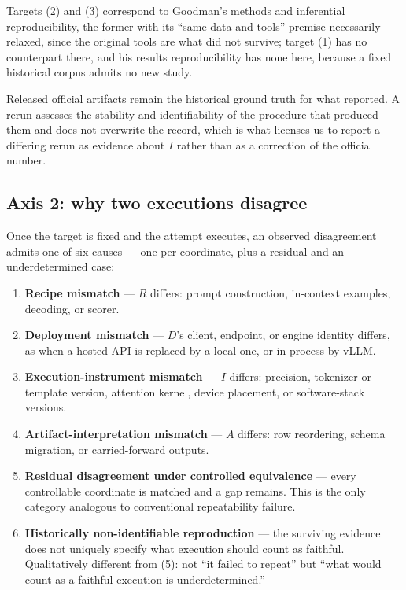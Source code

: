 Targets (2) and (3) correspond to Goodman's methods and inferential reproducibility, the former with its ``same data and tools'' premise necessarily relaxed, since the original tools are what did not survive; target (1) has no counterpart there, and his results reproducibility has none here, because a fixed historical corpus admits no new study.

Released official artifacts remain the historical ground truth for what \helm reported. A rerun assesses the stability and identifiability of the procedure that produced them and does not overwrite the record, which is what licenses us to report a differing rerun as evidence about $I$ rather than as a correction of the official number.

\subsection{Axis 2: why two executions disagree}
\label{sec:taxonomy}

Once the target is fixed and the attempt executes, an observed disagreement admits one of six causes --- one per coordinate, plus a residual and an underdetermined case:

\begin{enumerate}[nosep,leftmargin=1.6em]
  \item \textbf{Recipe mismatch} --- $R$ differs: prompt construction, in-context examples, decoding, or scorer.
  \item \textbf{Deployment mismatch} --- $D$'s client, endpoint, or engine identity differs, as when a hosted API is replaced by a local one, or in-process  by vLLM.
  \item \textbf{Execution-instrument mismatch} --- $I$ differs: precision, tokenizer or template version, attention kernel, device placement, or software-stack versions.
  \item \textbf{Artifact-interpretation mismatch} --- $A$ differs: row reordering, schema migration, or carried-forward outputs.
  \item \textbf{Residual disagreement under controlled equivalence} --- every controllable coordinate is matched and a gap remains. This is the only category analogous to conventional repeatability failure.
  \item \textbf{Historically non-identifiable reproduction} --- the surviving evidence does not uniquely specify what execution should count as faithful. Qualitatively different from (5): not ``it failed to repeat'' but ``what would count as a faithful execution is underdetermined.''
\end{enumerate}

